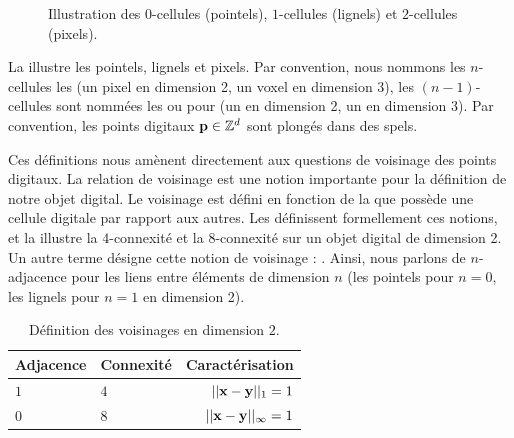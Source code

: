 \begin{figure}[ht]
  \begin{center}
    
    \caption{Illustration des $0$-cellules (pointels), $1$-cellules (lignels) et
    $2$-cellules (pixels).\label{fig:notations_topo}}
  \end{center}
\end{figure}

La  illustre les pointels, lignels et pixels. Par
convention, nous nommons les $n$-cellules les  (un pixel en
dimension 2, un voxel en dimension 3), les $(n-1)$-cellules sont nommées les
 ou  pour  (un
 en dimension 2, un  en dimension 3). Par
convention, les points digitaux $\mathbf{p} \in \mathbb{Z}^d$ sont plongés dans des
spels.


%
%
Ces définitions nous amènent directement aux questions de voisinage
des points digitaux. La relation de voisinage est une notion importante pour la
définition de notre objet digital. Le voisinage est défini en fonction de la
 que possède une cellule digitale par rapport aux autres.
Les  définissent formellement ces
notions, et la  illustre la $4$-connexité et la
$8$-connexité sur un objet digital de dimension 2. Un autre terme désigne cette
notion de voisinage : . Ainsi, nous parlons de
$n$-adjacence pour les liens entre éléments de dimension $n$ (\cad les pointels
pour $n=0$, les lignels pour $n=1$ en dimension 2).

\begin{table}[ht]
  \centering
  \caption{Définition des voisinages en dimension $2$.}
  \label{tab:adjacence2d}
    \renewcommand{\arraystretch}{1.1}
  \begin{tabular}{@{}llr@{}}
    \toprule
    Adjacence & Connexité  & Caractérisation \\ \midrule
    $1$ & $4$        & $||\mathbf{x} - \mathbf{y}||_1 = 1$ \\
    $0$ & $8$        & $||\mathbf{x} - \mathbf{y}||_\infty = 1$ \\
    \bottomrule
  \end{tabular}
\end{table}


